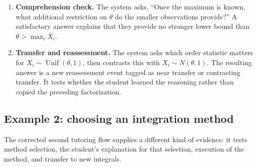 \documentclass[11pt]{article}
\begin{document}
\begin{enumerate}
    \item \textbf{Comprehension check.} The system asks, ``Once the maximum is known, what additional restriction on $\theta$ do the smaller observations provide?'' A satisfactory answer explains that they provide no stronger lower bound than $\theta>\max_i X_i$.

    \item \textbf{Transfer and reassessment.} The system asks which order statistic matters for $X_i\sim\operatorname{Unif}(\theta,1)$, then contrasts this with $X_i\sim N(\theta,1)$. The resulting answer is a new reassessment event tagged as near transfer or contrasting transfer. It tests whether the student learned the reasoning rather than copied the preceding factorization.
\end{enumerate}

\subsection{Example 2: choosing an integration method}

The corrected second tutoring flow supplies a different kind of evidence: it tests method selection, the student's explanation for that selection, execution of the method, and transfer to new integrals.
\end{document}
